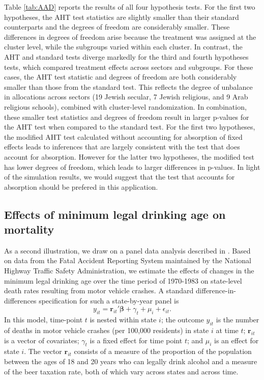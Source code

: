 \documentclass[12pt]{article}\usepackage[]{graphicx}\usepackage[]{color}
\newcommand{\bm}{\mathbf}
\newcommand{\bs}{\boldsymbol}
\begin{document}
Table \ref{tab:AAD} reports the results of all four hypothesis tests. 
For the first two hypotheses, the AHT test statistics are slightly smaller than their standard counterparts and the degrees of freedom are considerably smaller. 
These differences in degrees of freedom arise because the treatment was assigned at the cluster level, while the subgroups varied within each cluster. 
In contrast, the AHT and standard tests diverge markedly for the third and fourth hypotheses tests, which compared treatment effects across sectors and subgroups.
For these cases, the AHT test statistic and degrees of freedom are both considerably smaller than those from the standard test. 
This reflects the degree of unbalance in allocations across sectors (19 Jewish secular, 7 Jewish religious, and 9 Arab religious schools), combined with cluster-level randomization. 
In combination, these smaller test statistics and degrees of freedom result in larger p-values for the AHT test when compared to the standard test. 
For the first two hypotheses, the modified AHT test calculated without accounting for absorption of fixed effects leads to inferences that are largely consistent with the test that does account for absorption. 
However for the latter two hypotheses, the modified test has lower degrees of freedom, which leads to larger differences in p-values.
In light of the simulation results, we would suggest that the test that accounts for absorption should be prefered in this application. 

\subsection{Effects of minimum legal drinking age on mortality} 

As a second illustration, we draw on a panel data analysis described in \citet[see also \citealp{Carpenter2011minimum}]{Angrist2014mastering}.
Based on data from the Fatal Accident Reporting System maintained by the National Highway Traffic Safety Administration, we estimate the effects of changes in the minimum legal drinking age over the time period of 1970-1983 on state-level death rates resulting from motor vehicle crashes.
A standard difference-in-differences specification for such a state-by-year panel is
\begin{equation}
\label{eq:MLDA}
y_{it} = \bm{r}_{it}'\bs\beta + \gamma_t + \mu_i + \epsilon_{it}.
\end{equation}
In this model, time-point $t$ is nested within state $i$; the outcome $y_{it}$ is the number of deaths in motor vehicle crashes (per 100,000 residents) in state $i$ at time $t$; $\bm{r}_{it}$ is a vector of covariates; $\gamma_t$ is a fixed effect for time point $t$; and $\mu_i$ is an effect for state $i$. The vector $\bm{r}_{it}$ consists of a measure of the proportion of the population between the ages of 18 and 20 years who can legally drink alcohol and a measure of the beer taxation rate, both of which vary across states and across time.
\end{document}
